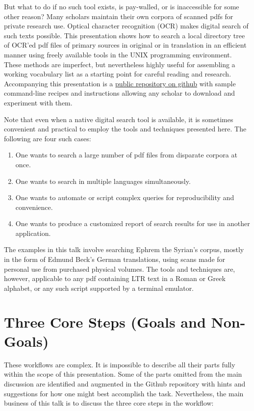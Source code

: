 \documentclass[
  letterpaper,
]{tufte-handout}
\providecommand{\tightlist}{%
  \setlength{\itemsep}{0pt}\setlength{\parskip}{0pt}}
\begin{document}
But what to do if no such tool exists, is pay-walled, or is inaccessible
for some other reason? Many scholars maintain their own corpora of
scanned pdfs for private research use. Optical character recognition
(OCR) makes digital search of such texts possible. This presentation
shows how to search a local directory tree of OCR'ed pdf files of
primary sources in original or in translation in an efficient manner
using freely available tools in the UNIX programming environment. These
methods are imperfect, but nevertheless highly useful for assembling a
working vocabulary list as a starting point for careful reading and
research. Accompanying this presentation is a
\href{==insert\%20link==}{public repository on github} with sample
command-line recipes and instructions allowing any scholar to download
and experiment with them.

Note that even when a native digital search tool is available, it is
sometimes convenient and practical to employ the tools and techniques
presented here. The following are four such cases:

\begin{enumerate}
\def\labelenumi{\arabic{enumi}.}
\tightlist
\item
  One wants to search a large number of pdf files from disparate corpora
  at once.
\item
  One wants to search in multiple languages simultaneously.
\item
  One wants to automate or script complex queries for reproducibility
  and convenience.
\item
  One wants to produce a customized report of search results for use in
  another application.
\end{enumerate}

The examples in this talk involve searching Ephrem the Syrian's corpus,
mostly in the form of Edmund Beck's German translations, using scans
made for personal use from purchased physical volumes. The tools and
techniques are, however, applicable to any pdf containing LTR text in a
Roman or Greek alphabet, or any such script supported by a terminal
emulator.

\section{Three Core Steps (Goals and
Non-Goals)}\label{three-core-steps-goals-and-non-goals}

These workflows are complex. It is impossible to describe all their
parts fully within the scope of this presentation. Some of the parts
omitted from the main discussion are identified and augmented in the
Github repository with hints and suggestions for how one might best
accomplish the task. Nevertheless, the main business of this talk is to
discuss the three core steps in the workflow:
\end{document}
